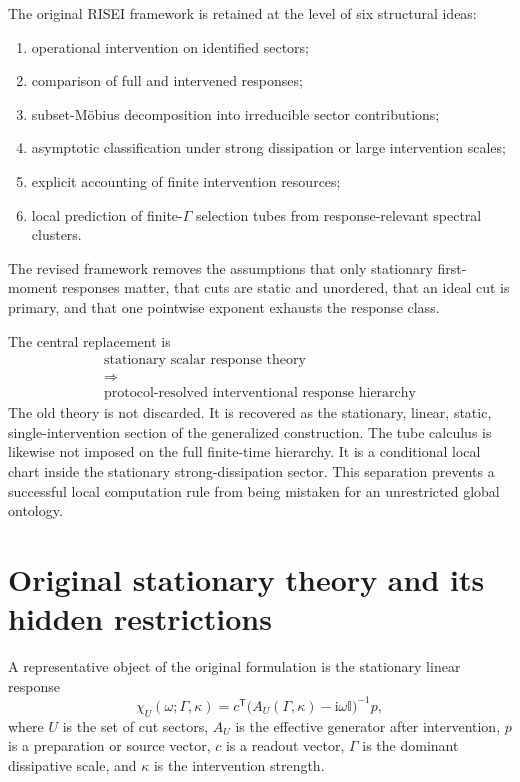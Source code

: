 \documentclass[11pt]{article}
\theoremstyle{definition}
\theoremstyle{remark}
\newcommand{\ii}{\mathrm i}
\newcommand{\id}{\mathbb I}
\begin{document}
The original RISEI framework is retained at the level of six structural ideas:
\begin{enumerate}
  \item operational intervention on identified sectors;
  \item comparison of full and intervened responses;
  \item subset-M\"obius decomposition into irreducible sector contributions;
  \item asymptotic classification under strong dissipation or large intervention scales;
  \item explicit accounting of finite intervention resources;
  \item local prediction of finite-$\Gamma$ selection tubes from response-relevant spectral clusters.
\end{enumerate}
The revised framework removes the assumptions that only stationary first-moment responses matter, that cuts are static and unordered, that an ideal cut is primary, and that one pointwise exponent exhausts the response class.

The central replacement is
\begin{equation}
\boxed{
\begin{gathered}
\text{stationary scalar response theory}\\[-0.2em]
\Longrightarrow\\[-0.2em]
\text{protocol-resolved interventional response hierarchy}
\end{gathered}}
\end{equation}
The old theory is not discarded. It is recovered as the stationary, linear, static, single-intervention section of the generalized construction. The tube calculus is likewise not imposed on the full finite-time hierarchy. It is a conditional local chart inside the stationary strong-dissipation sector. This separation prevents a successful local computation rule from being mistaken for an unrestricted global ontology.

\section{Original stationary theory and its hidden restrictions}

A representative object of the original formulation is the stationary linear response
\begin{equation}
\chi_U(\omega;\Gamma,\kappa)
 = c^{\mathsf T}
 \bigl(A_U(\Gamma,\kappa)-\ii\omega\id\bigr)^{-1}p,
\label{eq:old-response}
\end{equation}
where $U$ is the set of cut sectors, $A_U$ is the effective generator after intervention, $p$ is a preparation or source vector, $c$ is a readout vector, $\Gamma$ is the dominant dissipative scale, and $\kappa$ is the intervention strength.
\end{document}
